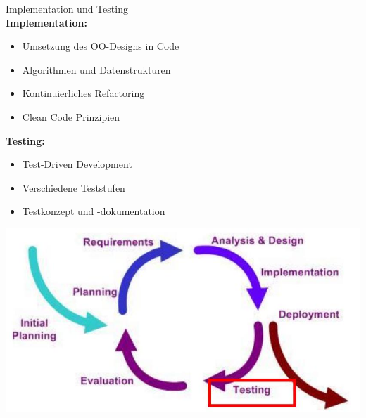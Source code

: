 \begin{concept}{Implementation und Testing}\\
\textbf{Implementation:}
\begin{itemize}
    \item Umsetzung des OO-Designs in Code
    \item Algorithmen und Datenstrukturen
    \item Kontinuierliches Refactoring
    \item Clean Code Prinzipien
\end{itemize}
\textbf{Testing:}
\begin{itemize}
    \item Test-Driven Development
    \item Verschiedene Teststufen
    \item Testkonzept und -dokumentation
\end{itemize}
\includegraphics[width=0.8\linewidth]{images/2025_01_02_6eafa38dd4ae10c9a392g-15}
\end{concept}